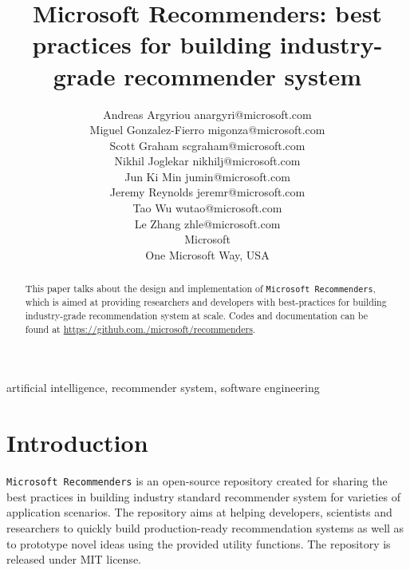 \documentclass[twoside,11pt]{article}
\begin{document}
\title{Microsoft Recommenders: best practices for building industry-grade recommender system}

\author{\name Andreas Argyriou \email anargyri@microsoft.com \\
  \name Miguel Gonzalez-Fierro \email migonza@microsoft.com \\
  \name Scott Graham \email scgraham@microsoft.com \\
  \name Nikhil Joglekar \email nikhilj@microsoft.com \\
  \name Jun Ki Min \email jumin@microsoft.com \\
  \name Jeremy Reynolds \email jeremr@microsoft.com \\
  \name Tao Wu \email wutao@microsoft.com \\
  \name Le Zhang \email zhle@microsoft.com \\
  \addr Microsoft \\
  One Microsoft Way, USA
}


\maketitle

\begin{abstract}%
  This paper talks about the design and implementation of \verb|Microsoft Recommenders|, which is aimed at providing researchers and developers with best-practices for building  industry-grade recommendation system at scale. Codes and documentation can be found at \url{https://github.com./microsoft/recommenders}. 
\end{abstract}

\begin{keywords}
  artificial intelligence, recommender system, software engineering
\end{keywords}

\section{Introduction}
\verb|Microsoft Recommenders| is an open-source repository created for sharing the best practices in building industry standard recommender system for varieties of application scenarios. The repository aims at helping developers, scientists and researchers to quickly build production-ready recommendation systems as well as to prototype novel ideas using the provided utility functions. The repository is released under MIT license.
\end{document}
